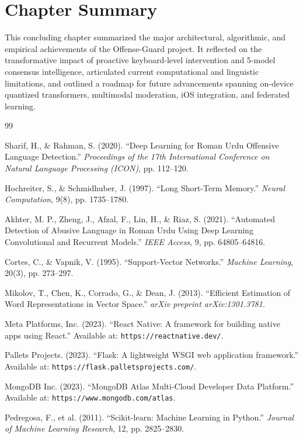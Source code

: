 \documentclass[A4paper,12pt]{report}
\theoremstyle{plain}
\theoremstyle{definition}
\theoremstyle{remark}
\numberwithin{equation}{section}
\renewenvironment{thebibliography}[1]{
  \begin{oldthebibliography}{#1}
    \setlength{\itemsep}{0em}
}
{
  \end{oldthebibliography}
}
\begin{document}
\section{Chapter Summary}
This concluding chapter summarized the major architectural, algorithmic, and empirical achievements of the Offense-Guard project. It reflected on the transformative impact of proactive keyboard-level intervention and 5-model consensus intelligence, articulated current computational and linguistic limitations, and outlined a roadmap for future advancements spanning on-device quantized transformers, multimodal moderation, iOS integration, and federated learning.

\begin{thebibliography}{99}
\vspace{-2cm}

Sharif, H., \& Rahman, S. (2020). ``Deep Learning for Roman Urdu Offensive Language Detection.'' \textit{Proceedings of the 17th International Conference on Natural Language Processing (ICON)}, pp. 112--120.

Hochreiter, S., \& Schmidhuber, J. (1997). ``Long Short-Term Memory.'' \textit{Neural Computation}, 9(8), pp. 1735--1780.

Akhter, M. P., Zheng, J., Afzal, F., Lin, H., \& Riaz, S. (2021). ``Automated Detection of Abusive Language in Roman Urdu Using Deep Learning Convolutional and Recurrent Models.'' \textit{IEEE Access}, 9, pp. 64805--64816.

Cortes, C., \& Vapnik, V. (1995). ``Support-Vector Networks.'' \textit{Machine Learning}, 20(3), pp. 273--297.

Mikolov, T., Chen, K., Corrado, G., \& Dean, J. (2013). ``Efficient Estimation of Word Representations in Vector Space.'' \textit{arXiv preprint arXiv:1301.3781}.

Meta Platforms, Inc. (2023). ``React Native: A framework for building native apps using React.'' Available at: \texttt{https://reactnative.dev/}.

Pallets Projects. (2023). ``Flask: A lightweight WSGI web application framework.'' Available at: \texttt{https://flask.palletsprojects.com/}.

MongoDB Inc. (2023). ``MongoDB Atlas Multi-Cloud Developer Data Platform.'' Available at: \texttt{https://www.mongodb.com/atlas}.

Pedregosa, F., et al. (2011). ``Scikit-learn: Machine Learning in Python.'' \textit{Journal of Machine Learning Research}, 12, pp. 2825--2830.


\end{thebibliography}
\end{document}
